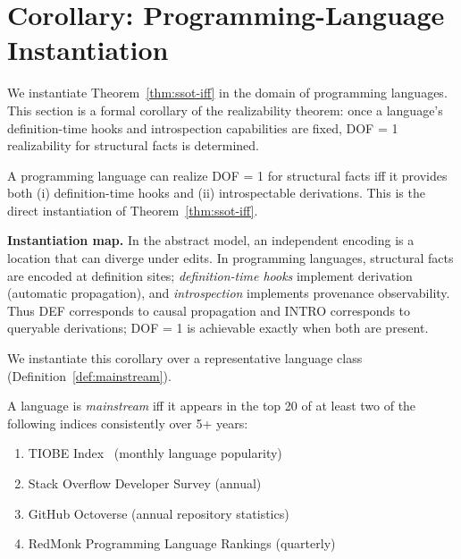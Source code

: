 \section{Corollary: Programming-Language Instantiation}\label{sec:evaluation}

We instantiate Theorem~\ref{thm:ssot-iff} in the domain of programming languages. This section is a formal corollary of the realizability theorem: once a language's definition-time hooks and introspection capabilities are fixed, DOF = 1 realizability for structural facts is determined.

\begin{corollary}\label{cor:lang-realizability}
A programming language can realize DOF = 1 for structural facts iff it provides both (i) definition-time hooks and (ii) introspectable derivations. This is the direct instantiation of Theorem~\ref{thm:ssot-iff}.
\end{corollary}

\textbf{Instantiation map.} In the abstract model, an independent encoding is a location that can diverge under edits. In programming languages, structural facts are encoded at definition sites; \emph{definition-time hooks} implement derivation (automatic propagation), and \emph{introspection} implements provenance observability. Thus DEF corresponds to causal propagation and INTRO corresponds to queryable derivations; DOF = 1 is achievable exactly when both are present.

We instantiate this corollary over a representative language class (Definition~\ref{def:mainstream}).

\begin{definition}\label{def:mainstream}
A language is \emph{mainstream} iff it appears in the top 20 of at least two of the following indices consistently over 5+ years:
\begin{enumerate}
\tightlist
\item TIOBE Index~\cite{tiobe2024} (monthly language popularity)
\item Stack Overflow Developer Survey (annual)
\item GitHub Octoverse (annual repository statistics)
\item RedMonk Programming Language Rankings (quarterly)
\end{enumerate}
\end{definition}

